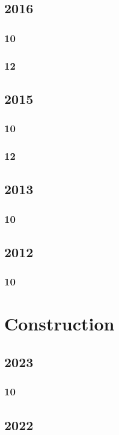 \documentclass[11pt]{book}
\begin{document}
\section{2016}
\subsection{10}

\subsection{12}

\section{2015}
\subsection{10}

\subsection{12}

\section{2013}
\subsection{10}

\section{2012}
\subsection{10}




\chapter{Construction}
\section{2023}
\subsection{10}

\section{2022}
\end{document}
